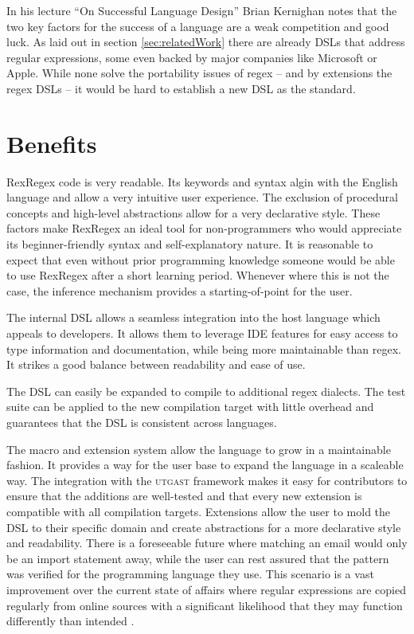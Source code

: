 In his lecture \enquote{On Successful Language Design} \cite{OnSuccessfulLanuageDesignKernighan} Brian Kernighan notes that the two key factors for the success of a language are a weak competition and good luck. As laid out in section \ref{sec:relatedWork} there are already DSLs that address regular expressions, some even backed by major companies like Microsoft or Apple. While none solve the portability issues of regex -- and by extensions the regex DSLs -- it would be hard to establish a new DSL as the standard.

\section{Benefits}
 
RexRegex code is very readable. Its keywords and syntax algin with the English language and allow a very intuitive user experience. The exclusion of procedural concepts and high-level abstractions allow for a very declarative style. These factors make RexRegex an ideal tool for non-programmers who would appreciate its beginner-friendly syntax and self-explanatory nature. It is reasonable to expect that even without prior programming knowledge someone would be able to use RexRegex after a short learning period. Whenever where this is not the case, the inference mechanism provides a starting-of-point for the user.

The internal DSL allows a seamless integration into the host language which appeals to developers. It allows them to leverage IDE features for easy access to type information and documentation, while being more maintainable than regex. It strikes a good balance between readability and ease of use.

The DSL can easily be expanded to compile to additional regex dialects. The test suite can be applied to the new compilation target with little overhead and guarantees that the DSL is consistent across languages.

The macro and extension system allow the language to grow in a maintainable fashion. It provides a way for the user base to expand the language in a scaleable way. The integration with the \textsc{utgast} framework makes it easy for contributors to ensure that the additions are well-tested and that every new extension is compatible with all compilation targets. Extensions allow the user to mold the DSL to their specific domain and create abstractions for a more declarative style and readability. There is a foreseeable future where matching an email would only be an import statement away, while the user can rest assured that the pattern was verified for the programming language they use. This scenario is a vast improvement over the current state of affairs where regular expressions are copied regularly from online sources with a significant likelihood that they may function differently than intended \cite{RegexNotLinguaFranca}.

